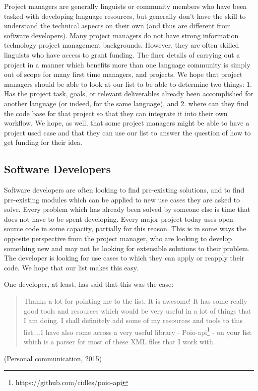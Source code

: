\documentclass[10pt, a4paper]{article}
\begin{document}
Project managers are generally linguists or community members who have been tasked with developing language resources, but generally don't have the skill to understand the technical aspects on their own (and thus are different from software developers). Many project managers do not have strong information technology project management backgrounds. However, they are often skilled linguists who have access to grant funding. The finer details of carrying out a project in a manner which benefits more than one language community is simply out of scope for many first time managers, and projects. We hope that project managers should be able to look at our list to be able to determine two things: 1. Has the project task, goals, or relevant deliverables already been accomplished for another language (or indeed, for the same language), and 2. where can they find the code base for that project so that they can integrate it into their own workflow. We hope, as well, that some project managers might be able to have a project used case and that they can use our list to answer the question of how to get funding for their idea. 

\subsection{Software Developers}

Software developers are often looking to find pre-existing solutions, and to find pre-existing modules which can be applied to new use cases they are asked to solve. Every problem which has already been solved by someone else is time that does not have to be spent developing. Every major project today uses open source code in some capacity, partially for this reason. This is in some ways the opposite perspective from the project manager, who are looking to develop something new and may not be looking for extensible solutions to their problem. The developer is looking for use cases to which they can apply or reapply their code. We hope that our list makes this easy. 

One developer, at least, has said that this was the case: \begin{quote}Thanks a lot for pointing me to the list. It is awesome! It has some really good tools and resources which would be very useful in a lot of things that I am doing. I shall definitely add some of my resources and tools to this list....I have also come across a very useful library - Poio-api\footnote{https://github.com/cidles/poio-api} - on your list which is a parser for most of these XML files that I work with.\end{quote} (Personal communication, 2015)
\end{document}

